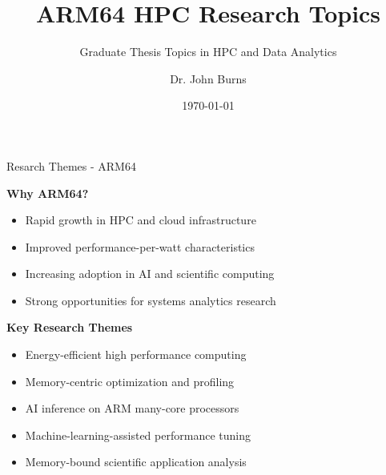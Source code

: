 \documentclass[aspectratio=169]{beamer}
\title{ARM64 HPC Research Topics}
\subtitle{Graduate Thesis Topics in HPC and Data Analytics}
\author{Dr. John Burns}
\date{\today}
\begin{document}
\begin{frame}
\titlepage
\end{frame}

\begin{frame}{Resarch Themes - ARM64}
\small

\textbf{Why ARM64?}
\begin{itemize}
\item Rapid growth in HPC and cloud infrastructure
\item Improved performance-per-watt characteristics
\item Increasing adoption in AI and scientific computing
\item Strong opportunities for systems analytics research
\end{itemize}

\vspace{0.5em}

\textbf{Key Research Themes}
\begin{itemize}
\item Energy-efficient high performance computing
\item Memory-centric optimization and profiling
\item AI inference on ARM many-core processors
\item Machine-learning-assisted performance tuning
\item Memory-bound scientific application analysis
\end{itemize}

\end{frame}

\end{document}
